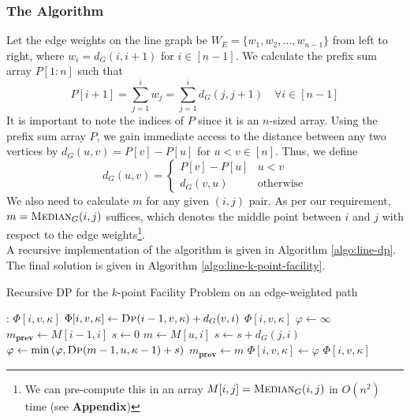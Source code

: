 \documentclass[9pt]{article}
\begin{document}
\subsubsection*{The Algorithm}
Let the edge weights on the line graph be $W_{E} = \{ w_{1}, w_{2}, \ldots, w_{n-1} \}$ from
left to right, where $w_{i} = d_{G}(i, i+1)$ for $i \in [n-1]$. We calculate the prefix sum
array $P[1:n]$ such that
\begin{equation}
    P[i+1] = \sum_{j=1}^{i} w_{j} = \sum_{j=1}^{i} d_{G}(j, j+1) \quad \forall i \in [n-1]
\end{equation}
It is important to note the indices of $P$ since it is an $n$-sized array. Using the prefix
sum array $P$, we gain immediate access to the distance between any two vertices by
$d_{G}(u, v) = P[v] - P[u]$ for $u < v \in [n]$. Thus, we define
\begin{equation}
    d_{G}(u, v) = \begin{cases}
        P[v] - P[u] & u < v \\
        d_{G}(v, u) & \text{otherwise}
    \end{cases}
\end{equation}
We also need to calculate $m$ for any given $(i, j)$ pair. As per our requirement,
$m = \textsc{Median}_{G}(i, j)$ suffices, which denotes the middle point between $i$ and
$j$ with respect to the edge weights\footnote{We can pre-compute this in an array
$M[i, j] = \textsc{Median}_{G}(i, j)$ in $O(n^{2})$ time (see \textbf{Appendix})}. \\
A recursive implementation of the algorithm is given in Algorithm \ref{algo:line-dp}. The final
solution is given in Algorithm \ref{algo:line-k-point-facility}.
\begin{algorithm}[H]
    \caption{Recursive DP for the $k$-point Facility Problem on an edge-weighted path}
    \label{algo:line-dp}
    \begin{algorithmic}[1]
        :
             
                \State \Return $\Phi[i, v, \kappa]$
             
                \State $\Phi[i, v, \kappa] \gets \Call{Dp}{i-1, v, \kappa} + d_{G}(v, i)$
                \State \Return $\Phi[i, v, \kappa]$
            \Else {}
                \State $\varphi \gets \infty$
                \State $m_{\textbf{prev}} \gets M[i-1, i]$
                \State $s \gets 0$
                    \State $m \gets M[u, i]$
                        \State $s \gets s + d_{G}(j, i)$
                    \EndFor
                    \State $\varphi \gets \min \left( \varphi, \Call{Dp}{m-1, u, \kappa-1} + s \right)$
                    \State $m_{\textbf{prev}} \gets m$
                \EndFor
                \State $\Phi[i, v, \kappa] \gets \varphi$
                \State \Return $\Phi[i, v, \kappa]$
            \EndIf
        \EndProcedure
    \end{algorithmic}
\end{algorithm}
\end{document}
